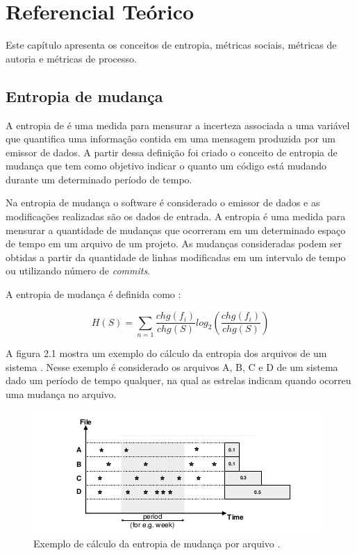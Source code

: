 \chapter{Referencial Teórico}
Este capítulo apresenta os conceitos de entropia, métricas sociais, métricas de autoria e métricas de processo.

\section{Entropia de mudança}
A entropia de  é uma medida para mensurar a incerteza associada a uma variável que quantifica uma informação contida em uma mensagem produzida por um emissor de dados. A partir dessa definição foi criado o conceito de entropia de mudança que tem como objetivo indicar o quanto um código está mudando durante um determinado período de tempo. 

Na entropia de mudança o software é considerado o emissor de dados e as modificações realizadas são os dados de entrada. A entropia é uma medida para mensurar a quantidade de mudanças que ocorreram em um determinado espaço de tempo em um arquivo de um projeto. As mudanças consideradas podem ser obtidas a partir da quantidade de linhas modificadas em um intervalo de tempo ou utilizando número de \textit{commits}.

A entropia de mudança é definida como \cite{Hassan:2009:PFU:1555001.1555024}:

\begin{equation}
H(S) = {\sum\limits_{n=1} }\frac{chg(f_i)}{chg(S)}log_2(\frac{chg(f_i)}{chg(S)})
\end{equation}

A figura 2.1 mostra um exemplo do cálculo da entropia dos arquivos de um sistema \cite{Hassan:2009:PFU:1555001.1555024}. Nesse exemplo é considerado os arquivos A, B, C e D de um sistema dado um período de tempo qualquer, na qual as estrelas indicam quando ocorreu uma mudança no arquivo.

\begin{figure}[h]
	\captionsetup{justification=centering}
	\includegraphics[width=\linewidth]{entropiamudanca.png}
	\caption{Exemplo de cálculo da entropia de mudança por arquivo \cite{Hassan:2009:PFU:1555001.1555024}.}
	\label{figura:entropiaimagem}
\end{figure}

